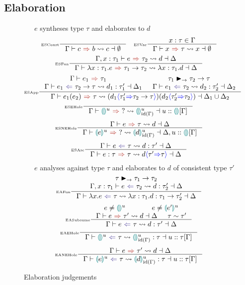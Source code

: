 \subsection{Elaboration}

\begin{figure}[H]
\small
{}\ \ \ $e$ syntheses type $\tau$ and elaborates to $d$
\tiny 
\[\inference[\tiny ESConst]{}{\elaborationSynthesis{c}{b}{c}{\emptyset}} \quad 
\inference[\tiny ESVar]{x : \tau \in \Gamma}{\elaborationSynthesis{x}{\tau}{x}{\emptyset}}\]
\[\inference[\tiny ESFun]{\elaborationSynthesis[\Gamma,x:\tau_1]{e}{\tau_2}{d}{\Delta}}{\elaborationSynthesis{\lambda x:\tau_1.e}{\tau_1 \to \tau_2}{\lambda x:\tau_1. d}{\Delta}}\]
\[\inference[\tiny ESApp]{\synthesis{e_1}{\tau_1} & \tau_1 \funmatch \tau_2 \to \tau \\ \elaborationAnalysis{e_1}{\tau_2 \to \tau}{d_1}{\tau_1'}{\Delta_1} & \elaborationAnalysis{e_1}{\tau_2}{d_2}{\tau_2'}{\Delta_2}}{\elaborationSynthesis{e_1(e_2)}{\tau}{(d_1\scast{\tau_1'}{\tau_2 \to \tau})(d_2\scast{\tau_2'}{\tau_2})}{\Delta_1 \cup \Delta_2}}\]
\[\inference[\tiny ESEHole]{}{\elaborationSynthesis{\hole^u}{?}{\hole^u_{\mathrm{id}(\Gamma)}}{u :: \hole[] [\Gamma]}}\]
\[\inference[\tiny ESNEHole]{\elaborationSynthesis{e}{\tau}{d}{\Delta}}{\elaborationSynthesis{\hole[e]^u}{?}{\hole[d]^u_{\mathrm{id}(\Gamma)}}{\Delta, u :: \hole[] [\Gamma]}}\]
\[\inference[\tiny ESAsc]{\elaborationAnalysis{e}{\tau}{d}{\tau'}{\Delta}}{\elaborationSynthesis{e:\tau}{\tau}{d\scast{\tau'}{\tau}}{\Delta}}\]
\small
{}\ \ \ $e$ analyses against type $\tau$ and elaborates to $d$ of consistent type $\tau'$
\tiny 
\[\inference[\tiny EAFun]{\tau \funmatch \tau_1 \to \tau_2 \\ \elaborationAnalysis[\Gamma,x:\tau_1]{e}{\tau_2}{d}{\tau_2'}{\Delta}}{\elaborationAnalysis{\lambda x. e}{\tau}{\lambda x:\tau_1. d}{\tau_1 \to \tau_2'}{\Delta}}\]
\[\inference[\tiny EASubsume]{e \neq \hole^u & e \neq \hole[e']^u \\ \elaborationSynthesis{e}{\tau'}{d}{\Delta} & \tau \sim \tau'}{\elaborationAnalysis{e}{\tau}{d}{\tau'}{\Delta}}\]
\[\inference[\tiny EAEHole]{}{\elaborationAnalysis{\hole^u}{\tau}{\hole^u_{\mathrm{id}(\Gamma)}}{\tau}{u::\tau[\Gamma]}}\]
\[\inference[\tiny EANEHole]{\elaborationSynthesis{e}{\tau'}{d}{\Delta}}{\elaborationAnalysis{\hole[e]^u}{\tau}{\hole[d]^u_{\mathrm{id}(\Gamma)}}{\tau}{u::\tau[\Gamma]}}\]

\caption{Elaboration judgements} 
\label{fig:elaboration}
\end{figure}

